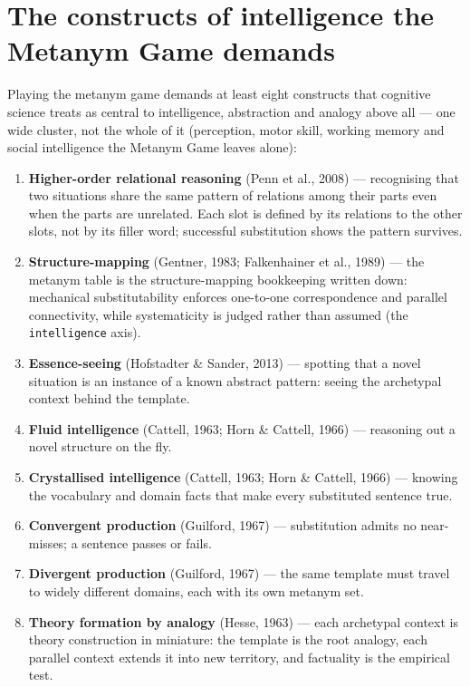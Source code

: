 \documentclass{article}
\providecommand{\tightlist}{\setlength{\itemsep}{0pt}\setlength{\parskip}{0pt}}
\begin{document}
\section{The constructs of intelligence the Metanym Game demands}\label{the-constructs-of-intelligence-the-metanym-game-demands}

Playing the metanym game demands at least eight constructs that cognitive science treats as central to intelligence, abstraction and analogy above all --- one wide cluster, not the whole of it (perception, motor skill, working memory and social intelligence the Metanym Game leaves alone):

\begin{enumerate}
\def\labelenumi{\arabic{enumi}.}
\tightlist
\item
  \textbf{Higher-order relational reasoning} (Penn et al., 2008) --- recognising that two situations share the same pattern of relations among their parts even when the parts are unrelated. Each slot is defined by its relations to the other slots, not by its filler word; successful substitution shows the pattern survives.
\item
  \textbf{Structure-mapping} (Gentner, 1983; Falkenhainer et al., 1989) --- the metanym table is the structure-mapping bookkeeping written down: mechanical substitutability enforces one-to-one correspondence and parallel connectivity, while systematicity is judged rather than assumed (the \texttt{intelligence} axis).
\item
  \textbf{Essence-seeing} (Hofstadter \& Sander, 2013) --- spotting that a novel situation is an instance of a known abstract pattern: seeing the archetypal context behind the template.
\item
  \textbf{Fluid intelligence} (Cattell, 1963; Horn \& Cattell, 1966) --- reasoning out a novel structure on the fly.
\item
  \textbf{Crystallised intelligence} (Cattell, 1963; Horn \& Cattell, 1966) --- knowing the vocabulary and domain facts that make every substituted sentence true.
\item
  \textbf{Convergent production} (Guilford, 1967) --- substitution admits no near-misses; a sentence passes or fails.
\item
  \textbf{Divergent production} (Guilford, 1967) --- the same template must travel to widely different domains, each with its own metanym set.
\item
  \textbf{Theory formation by analogy} (Hesse, 1963) --- each archetypal context is theory construction in miniature: the template is the root analogy, each parallel context extends it into new territory, and factuality is the empirical test.
\end{enumerate}
\end{document}

